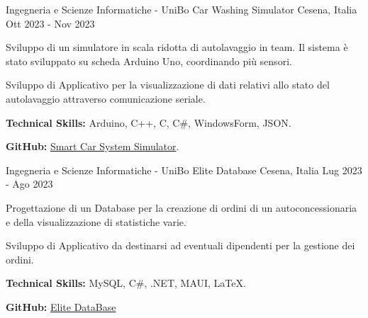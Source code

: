 

\begin{cventries}

  \cventry
    {Ingegneria e Scienze Informatiche - UniBo} %
    {Car Washing Simulator} %
    {Cesena, Italia} %
    {Ott 2023 - Nov 2023} %
    {
      \begin{cvitems} %
        \item {Sviluppo di un simulatore in scala ridotta di autolavaggio in team. Il sistema è stato sviluppato su scheda Arduino Uno, coordinando più sensori.}
        \item {Sviluppo di Applicativo per la visualizzazione di dati relativi allo stato del autolavaggio attraverso comunicazione seriale.}
        \item {\textbf{Technical Skills:} Arduino, C++, C, C\#, WindowsForm, JSON.}
        \item {\textbf{GitHub:} \href{https://github.com/elvisperlika/Smart-Car-Washing-System.git}{Smart Car System Simulator}.}
      \end{cvitems}
    }


  \cventry
    {Ingegneria e Scienze Informatiche - UniBo} %
    {Elite Database} %
    {Cesena, Italia} %
    {Lug 2023 - Ago 2023} %
    {
      \begin{cvitems} %
        \item {Progettazione di un Database per la creazione di ordini di un autoconcessionaria e della visualizzazione di statistiche varie.}
        \item {Sviluppo di Applicativo da destinarsi ad eventuali dipendenti per la gestione dei ordini.}
        \item {\textbf{Technical Skills:} MySQL, C\#, .NET, MAUI, LaTeX.}
        \item {\textbf{GitHub:} \href{https://github.com/elvisperlika/Elite-db.git}{Elite DataBase}}
      \end{cvitems}
    }


\end{cventries}
